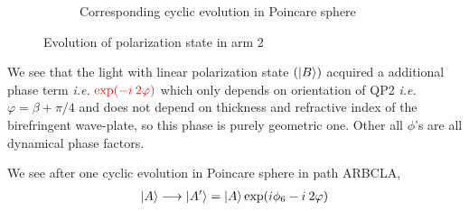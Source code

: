 \documentclass[11pt,a4paper]{article}
\numberwithin{equation}{section}
\begin{document}
\begin{figure}[t]
\begin{subfigure}[H]{0.4\textwidth}
		\caption{Corresponding cyclic evolution in Poincare sphere}
		\label{fig:pancha b}
	\end{subfigure}
	\caption{Evolution of polarization state in arm 2}
	\label{fig:pancha}
\end{figure}


We see that the light with linear polarization state $(\ket{B})$ acquired a additional phase term \textit{i.e.} ${\color{red}\exp(-i\:2\varphi)}$ which only depends on orientation of QP2 \textit{i.e.} $\varphi= \beta+\pi/4$ and does not depend on thickness and refractive index of the birefringent wave-plate, so this phase is purely geometric one. Other all $\phi$'s are all dynamical phase factors. \cite{WO}

We see after one cyclic evolution in Poincare sphere in path ARBCLA,
\begin{align}
	\ket{A}\longrightarrow\ket{A'}=\ket{A}\exp(i\phi_6-i\:2\varphi)
\end{align}
\end{document}
